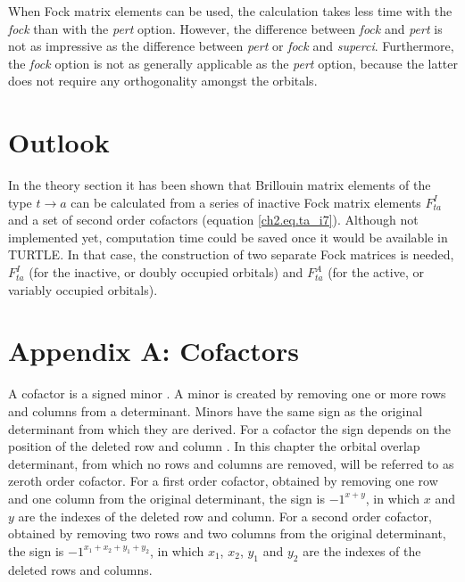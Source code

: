 When Fock matrix elements can be used, the calculation takes less time with the \textit{fock} than with the \textit{pert} option. However, the difference between \textit{fock} and \textit{pert} is not as impressive as the difference between \textit{pert} or \textit{fock} and \textit{superci}. Furthermore, the \textit{fock} option is not as generally applicable as the \textit{pert} option, because the latter does not require any orthogonality amongst the orbitals.

\section{Outlook}

In the theory section it has been shown that Brillouin matrix elements of the type $t \rightarrow a$ can be calculated from a series of inactive Fock matrix elements $F^{I}_{ta}$ and a set of second order cofactors (equation \ref{ch2.eq.ta_i7}). Although not implemented yet, computation time could be saved once it would be available in TURTLE. In that case, the construction of two separate Fock matrices is needed, $F^{I}_{ta}$ (for the inactive, or doubly occupied orbitals) and $F^{A}_{ta}$ (for the active, or variably occupied orbitals).

\section*{Appendix A: Cofactors}

A cofactor is a signed minor \cite{aitken}. A minor is created by removing one or more rows and columns from a determinant. Minors have the same sign as the original determinant from which they are derived. For a cofactor the sign depends on the position of the deleted row and column \cite{fokkeproef}. In this chapter the orbital overlap determinant, from which no rows and columns are removed, will be referred to as zeroth order cofactor. For a first order cofactor, obtained by removing one row and one column from the original determinant, the sign is $-1^{x+y}$, in which $x$ and $y$ are the indexes of the deleted row and column. For a second order cofactor, obtained by removing two rows and two columns from the original determinant, the sign is $-1^{x_1+x_2+y_1+y_2}$, in which $x_1$, $x_2$, $y_1$ and $y_2$ are the indexes of the deleted rows and columns. 

